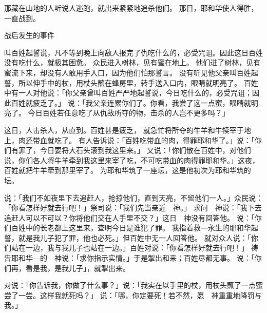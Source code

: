 {那藏在{}山地的{}人听说{}人逃跑，就出来紧紧地追杀他们。
那日，耶和华使{}人得胜，一直战到{}。
\par }{\SH 战后发生的事件
\par }{\PP {}叫百姓起誓说，凡不等到晚上向敌人报完了仇吃什么的，必受咒诅。因此这日百姓没有吃什么，就极其困惫。
众民进入树林，见有蜜在地上。
他们进了树林，见有蜜流下来，却没有人敢用手{}入口，因为他们怕那誓言。
没有听见他父亲叫百姓起誓，所以伸手中的杖，用杖头蘸在蜂房里，转手送入口内，眼睛就明亮了。
百姓中有一人对他说：「你父亲曾叫百姓严严地起誓说，今日吃什么的，必受咒诅；因此百姓就疲乏了。」
说：「我父亲连累你们了。你看，我尝了这一点蜜，眼睛就明亮了。
今日百姓若任意吃了从仇敌所夺的物，击杀的{}人岂不更多吗？」
\par }{\PP {}这日，{}人击杀{}人，从{}直到{}。百姓甚是疲乏，
就急忙将所夺的牛羊和牛犊宰于地上，肉还带血就吃了。
有人告诉{}说：「百姓吃带血的肉，得罪耶和华了。」{}说：「你们有罪了，今日要将大石头滚到我这里来。」
又说：「你们散在百姓中，对他们说，你们各人将牛羊牵到我这里来宰了吃，不可吃带血的肉得罪耶和华。」这夜，百姓就把牛羊牵到那里宰了。
为耶和华筑了一座坛，这是他初次为耶和华筑的坛。
\par }{\PP {}说：「我们不如夜里下去追赶{}人，抢掠他们，直到天亮，不留他们一人。」众民说：「你看怎样好就去行吧！」祭司说：「我们先当亲近　神。」
求问　神说：「我下去追赶{}人可以不可以？你将他们交在{}人手里不交？」这日　神没有回答他。
说：「你们百姓中的长老都上这里来，查明今日是谁犯了罪。
我指着救{}—永生的耶和华起誓，就是我儿子{}犯了罪，他也必死。」但百姓中无一人回答他。
就对{}众人说：「你们站在一边，我与我儿子{}也站在一边。」百姓对{}说：「你看怎样好就去行吧！」
祷告耶和华—{}的　神说：「求你指示实情。」于是{}掣出{}和{}来；百姓尽都无事。
说：「你们再{}，看是我，是我儿子{}」，就掣出{}来。
\par }{\PP {}对{}说：「你告诉我，你做了什么事？」{}说：「我实在以手里的杖，用杖头蘸了一点蜜尝了一尝。这样我就死吗？」
说：「{}哪，你定要死！若不然，愿　神重重地降罚与我。」
}

